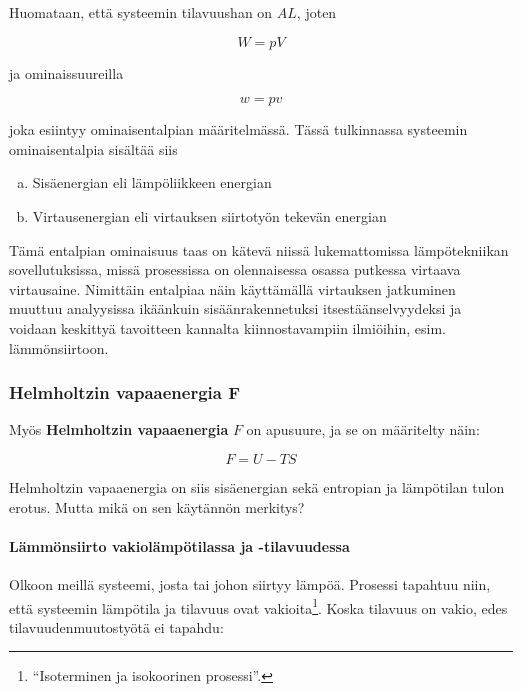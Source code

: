 \documentclass[12pt,a4paper,finnish]{book}
\begin{document}
Huomataan, että systeemin tilavuushan on $AL$, joten

\begin{equation}
 W = pV
\end{equation}

ja ominaissuureilla 

\begin{equation}
 w = pv
\end{equation}

joka esiintyy ominaisentalpian määritelmässä. Tässä tulkinnassa systeemin ominaisentalpia sisältää siis

\begin{enumerate}[a)]
 \item Sisäenergian eli lämpöliikkeen energian
 \item Virtausenergian eli virtauksen siirtotyön tekevän energian
\end{enumerate}

Tämä entalpian ominaisuus taas on kätevä niissä lukemattomissa lämpötekniikan sovellutuksissa, missä prosessissa on 
olennaisessa osassa putkessa virtaava virtausaine. Nimittäin entalpiaa näin käyttämällä virtauksen jatkuminen muuttuu 
analyysissa ikäänkuin sisäänrakennetuksi itsestäänselvyydeksi ja voidaan keskittyä tavoitteen kannalta kiinnostavampiin 
ilmiöihin, esim. lämmönsiirtoon.

\subsubsection{Helmholtzin vapaaenergia F} \label{sssection:helmholtz}

Myös \textbf{Helmholtzin vapaaenergia} $F$ on apusuure, ja se on määritelty näin:

\begin{equation}
 F = U - TS
\end{equation}

Helmholtzin vapaaenergia on siis sisäenergian sekä entropian ja lämpötilan tulon erotus. Mutta mikä on sen 
käytännön merkitys?

\paragraph{Lämmönsiirto vakiolämpötilassa ja -tilavuudessa}

Olkoon meillä systeemi, josta tai johon siirtyy lämpöä. Prosessi tapahtuu niin, että systeemin lämpötila ja 
tilavuus ovat vakioita\footnote{``Isoterminen ja isokoorinen prosessi''.}. 
Koska tilavuus on vakio, edes tilavuudenmuutostyötä ei tapahdu:
\end{document}

